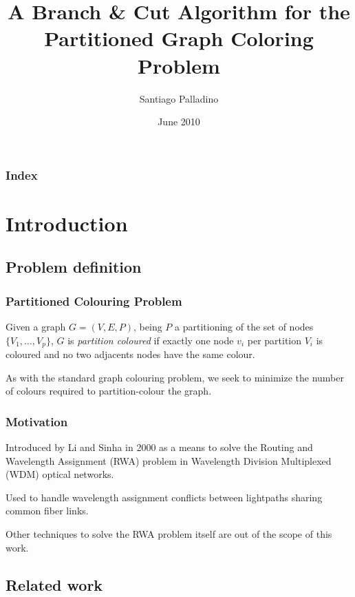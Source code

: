 \documentclass{beamer}
\begin{document}
\title{A Branch \& Cut Algorithm for the Partitioned Graph Coloring Problem}
\author{Santiago Palladino}
\date{June 2010}

\begin{frame}
\titlepage
\end{frame}

\begin{frame}
\frametitle{Index}
\tableofcontents
\end{frame} 

\setlength{\parskip}{10pt plus 1pt minus 1pt}

\section{Introduction}
\subsection{Problem definition}

\begin{frame}
\frametitle{Partitioned Colouring Problem}

\begin{definition}
Given a graph $G=(V,E,P)$, being $P$ a partitioning of the set of nodes $\{V_1,\ldots,V_p\}$, $G$ is \textit{partition coloured} if exactly one node $v_i$ per partition $V_i$ is coloured and no two adjacents nodes have the same colour.
\end{definition}

As with the standard graph colouring problem, we seek to minimize the number of colours required to partition-colour the graph.

\end{frame} 

\begin{frame} 
\frametitle{Motivation}

Introduced by Li and Sinha in 2000 as a means to solve the Routing and Wavelength Assignment (RWA) problem in Wavelength Division Multiplexed (WDM) optical networks. 

Used to handle wavelength assignment conflicts between lightpaths sharing common fiber links.

Other techniques to solve the RWA problem itself are out of the scope of this work.

\end{frame} 

\subsection{Related work}
\end{document}
